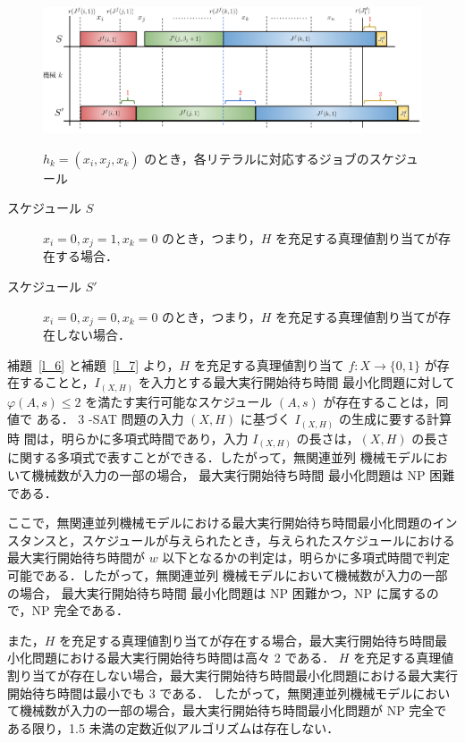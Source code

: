 \documentclass[12pt]{optlab-bachelor}
\begin{document}
\begin{figure}[h]
  \centering
  \includegraphics[width = 16cm]{figure/3SAT2.pdf}\\
  \caption{$h_k = (x_i, x_j, x_k)$ のとき，各リテラルに対応するジョブのスケジュール}
\end{figure}

\begin{description}
  \item[スケジュール $S$ ] $x_i = 0, x_j = 1, x_k = 0$ のとき，つまり，$H$ を充足する真理値割り当てが存在する場合．
  \item[スケジュール $S'$ ] $x_i = 0, x_j = 0, x_k = 0$ のとき，つまり，$H$ を充足する真理値割り当てが存在しない場合．
\end{description}

補題~\ref{l_6} と補題~\ref{l_7} より，$H$ を充足する真理値割り当て $f : X \to \{0,
1\}$ が存在することと，$I_{(X,H)}$ を入力とする最大実行開始待ち時間
最小化問題に対して $\varphi(A,s) \le 2$
を満たす実行可能なスケジュール $(A,s)$ が存在することは，同値で
ある．
3 -SAT 問題の入力 $(X,H)$ に基づく $I_{(X,H)}$ の生成に要する計算時
間は，明らかに多項式時間であり，入力 $I_{(X,H)}$ の長さは，$(X, H)$
の長さに関する多項式で表すことができる．したがって，無関連並列
機械モデルにおいて機械数が入力の一部の場合， 最大実行開始待ち時間
最小化問題は NP 困難である．

ここで，無関連並列機械モデルにおける最大実行開始待ち時間最小化問題のインスタンスと，スケジュールが与えられたとき，与えられたスケジュールにおける最大実行開始待ち時間が $w$ 以下となるかの判定は，明らかに多項式時間で判定可能である．したがって，無関連並列
機械モデルにおいて機械数が入力の一部の場合， 最大実行開始待ち時間
最小化問題は NP 困難かつ，NP に属するので，NP 完全である．

また，$H$ を充足する真理値割り当てが存在する場合，最大実行開始待ち時間最小化問題における最大実行開始待ち時間は高々 2 である．
$H$ を充足する真理値割り当てが存在しない場合，最大実行開始待ち時間最小化問題における最大実行開始待ち時間は最小でも 3 である．
したがって，無関連並列機械モデルにおいて機械数が入力の一部の場合，最大実行開始待ち時間最小化問題が NP 完全である限り，1.5 未満の定数近似アルゴリズムは存在しない．
\end{document}

